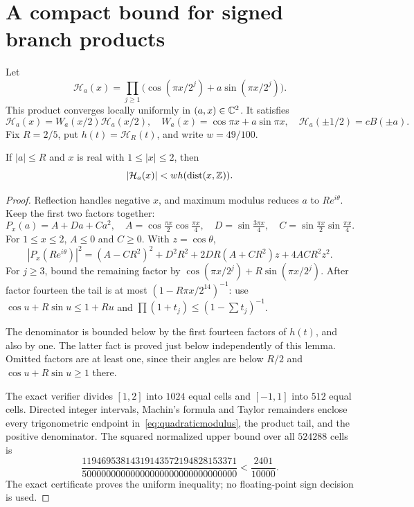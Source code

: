 \documentclass[11pt,a4paper]{article}
\theoremstyle{remark}\newtheorem*{ednote}{Editorial note (ProveIt, 2026-10-01)}
\begin{document}
\section{A compact bound for signed branch products}
Let
\[
 \mathcal H_a(x)=\prod_{j\ge1}\bigl(\cos(\pi x/2^j)+a\sin(\pi x/2^j)\bigr).
\]
This product converges locally uniformly in $(a,x)\in\mathbb C^2$. It satisfies
\begin{equation}\label{eq:productidentity}
 \mathcal H_a(x)=W_a(x/2)\mathcal H_a(x/2),\quad
 W_a(x)=\cos\pi x+a\sin\pi x,\quad
 \mathcal H_a(\pm1/2)=cB(\pm a).
\end{equation}
Fix $R=2/5$, put $h(t)=\mathcal H_R(t)$, and write $w=49/100$.
\begin{lemma}\label{lem:outer}
If $|a|\le R$ and $x$ is real with $1\le|x|\le2$, then
\[
 |\mathcal H_a(x)|<w h(\operatorname{dist}(x,\mathbb Z)).
\]
\end{lemma}
\begin{proof}
Reflection handles negative $x$, and maximum modulus reduces $a$ to $Re^{i\theta}$. Keep the first two factors together:
\[
 P_x(a)=A+Da+Ca^2,\quad
 A=\cos\tfrac{\pi x}{2}\cos\tfrac{\pi x}{4},\quad
 D=\sin\tfrac{3\pi x}{4},\quad
 C=\sin\tfrac{\pi x}{2}\sin\tfrac{\pi x}{4}.
\]
For $1\le x\le2$, $A\le0$ and $C\ge0$. With $z=\cos\theta$,
\begin{equation}\label{eq:quadraticmodulus}
 |P_x(Re^{i\theta})|^2=(A-CR^2)^2+D^2R^2
       +2DR(A+CR^2)z+4ACR^2z^2.
\end{equation}
For $j\ge3$, bound the remaining factor by
$\cos(\pi x/2^j)+R\sin(\pi x/2^j)$. After factor fourteen the tail is at most
$(1-R\pi x/2^{14})^{-1}$: use $\cos u+R\sin u\le1+Ru$ and
$\prod(1+t_j)\le(1-\sum t_j)^{-1}$.

The denominator is bounded below by the first fourteen factors of $h(t)$, and also by one. The latter fact is proved just below independently of this lemma. Omitted factors are at least one, since their angles are below $R/2$ and $\cos u+R\sin u\ge1$ there.

The exact verifier divides $[1,2]$ into $1024$ equal cells and $[-1,1]$ into $512$ equal cells. Directed integer intervals, Machin's formula and Taylor remainders enclose every trigonometric endpoint in~\eqref{eq:quadraticmodulus}, the product tail, and the positive denominator. The squared normalized upper bound over all $524288$ cells is
\[
 \frac{11946953814319143572194828153371}
      {50000000000000000000000000000000}<\frac{2401}{10000}.
\]
The exact certificate proves the uniform inequality; no floating-point sign decision is used.
\end{proof}
\end{document}
